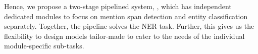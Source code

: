 Hence, we propose a two-stage pipelined system, \modelname{},  which has independent dedicated modules to focus on mention span detection and entity classification separately. Together, the pipeline solves the NER task. Further, this gives us the flexibility to design models tailor-made to cater to the needs of the individual module-specific sub-tasks.
